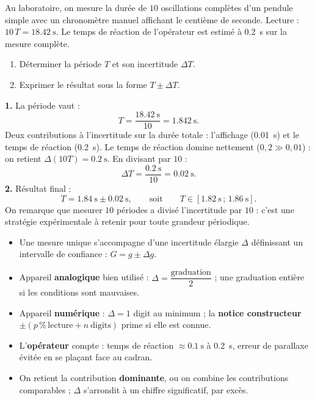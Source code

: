 \documentclass[11pt]{article}
\newcommand{\cle}[1]{{\popxbold\color{popdark}#1}}
\begin{document}
\begin{exoresolu}
Au laboratoire, on mesure la durée de $10$ oscillations complètes d'un pendule simple avec un chronomètre manuel affichant le centième de seconde. Lecture : $10\,T = \SI{18,42}{\second}$. Le temps de réaction de l'opérateur est estimé à \SI{0,2}{\second} sur la mesure complète.
\begin{enumerate}
\item Déterminer la période $T$ et son incertitude $\Delta T$.
\item Exprimer le résultat sous la forme $T \pm \Delta T$.
\end{enumerate}
\tcblower
\textbf{1.} La période vaut :
\[
T = \frac{\SI{18,42}{\second}}{10} = \SI{1,842}{\second}.
\]
Deux contributions à l'incertitude sur la durée totale : l'affichage (\SI{0,01}{\second}) et le temps de réaction (\SI{0,2}{\second}). Le temps de réaction domine nettement ($0,2 \gg 0,01$) : on retient $\Delta(10T) = \SI{0,2}{\second}$. En divisant par $10$ :
\[
\Delta T = \frac{\SI{0,2}{\second}}{10} = \SI{0,02}{\second}.
\]
\textbf{2.} Résultat final :
\[
T = \SI{1,84}{\second} \pm \SI{0,02}{\second},
\qquad\text{soit}\qquad
T \in [\SI{1,82}{\second}\,;\,\SI{1,86}{\second}].
\]
On remarque que mesurer $10$ périodes a divisé l'incertitude par $10$ : c'est une stratégie expérimentale à retenir pour toute grandeur périodique.
\end{exoresolu}

\begin{aretenir}
\begin{itemize}
\item Une mesure unique s'accompagne d'une \cle{incertitude élargie} $\Delta$ définissant un intervalle de confiance : $G = g \pm \Delta g$.
\item Appareil \textbf{analogique} bien utilisé : $\Delta = \dfrac{\text{graduation}}{2}$ ; une graduation entière si les conditions sont mauvaises.
\item Appareil \textbf{numérique} : $\Delta = 1$ digit au minimum ; la \textbf{notice constructeur} $\pm(p\,\%\,\text{lecture} + n\ \text{digits})$ prime si elle est connue.
\item L'\textbf{opérateur} compte : temps de réaction $\approx \SI{0,1}{\second}$ à \SI{0,2}{\second}, erreur de parallaxe évitée en se plaçant face au cadran.
\item On retient la contribution \textbf{dominante}, ou on combine les contributions comparables ; $\Delta$ s'arrondit à un chiffre significatif, par excès.
\end{itemize}
\end{aretenir}
\end{document}
